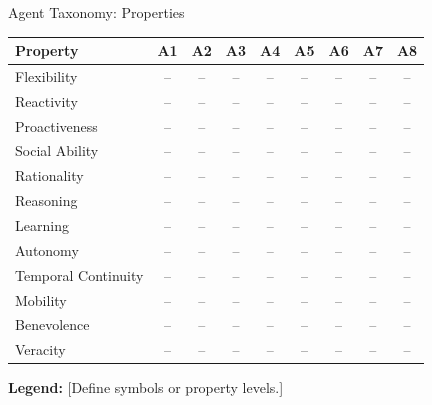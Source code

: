 

\begin{frame}{Agent Taxonomy: Properties}

\centering
\scriptsize

\renewcommand{\arraystretch}{0.78}

\begin{table}
\centering

\begin{tabular}{lcccccccc}
\toprule
\textbf{Property} &
A1 & A2 & A3 & A4 & A5 & A6 & A7 & A8 \\
\midrule
Flexibility         & -- & -- & -- & -- & -- & -- & -- & -- \\
Reactivity          & -- & -- & -- & -- & -- & -- & -- & -- \\
Proactiveness       & -- & -- & -- & -- & -- & -- & -- & -- \\
Social Ability      & -- & -- & -- & -- & -- & -- & -- & -- \\
Rationality         & -- & -- & -- & -- & -- & -- & -- & -- \\
Reasoning           & -- & -- & -- & -- & -- & -- & -- & -- \\
Learning            & -- & -- & -- & -- & -- & -- & -- & -- \\
Autonomy            & -- & -- & -- & -- & -- & -- & -- & -- \\
Temporal Continuity & -- & -- & -- & -- & -- & -- & -- & -- \\
Mobility            & -- & -- & -- & -- & -- & -- & -- & -- \\
Benevolence         & -- & -- & -- & -- & -- & -- & -- & -- \\
Veracity            & -- & -- & -- & -- & -- & -- & -- & -- \\
\bottomrule
\end{tabular}

\end{table}

\vspace{0.1cm}

{\footnotesize
\textbf{Legend:}
[Define symbols or property levels.]
}

\end{frame}
